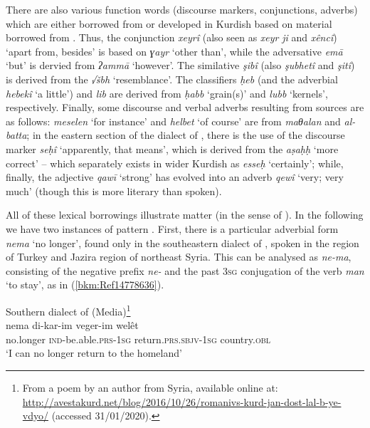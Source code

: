 \documentclass[output=paper]{langsci/langscibook}
\begin{document}
There are also various function words (discourse markers, conjunctions, adverbs) which are either borrowed from  or developed in Kurdish based on material borrowed from . Thus, the conjunction \textit{xeyrî} (also seen as \textit{xeyr} \textit{ji} and \textit{xêncî}) ‘apart from, besides’ is based on  \textit{ɣayr} ‘other than’, while the adversative \textit{emā} ‘but’ is dervied from  \textit{ʔammā} ‘however’. The similative \textit{şibî} (also \textit{şubhetî} and \textit{şitî}) is derived from the   \textit{√šbh} ‘resemblance’. The classifiers \textit{ḥeb} (and the adverbial \textit{hebekî} ‘a little’) and \textit{lib} are derived from  \textit{ḥabb} ‘grain(s)’ and \textit{lubb} ‘kernels’, respectively. Finally, some discourse and verbal adverbs resulting from  sources are as follows: \textit{meselen} ‘for instance’ and \textit{helbet} ‘of course’ are from  \textit{maθalan} and \textit{al-batta}; in the eastern section of the  dialect of , there is the use of the discourse marker \textit{seḥî} ‘apparently, that means’, which is derived from the  \textit{aṣaḥḥ} ‘more correct’ – which separately exists in wider Kurdish as \textit{esseḥ} ‘certainly’; while, finally, the  adjective \textit{qawī} ‘strong’ has evolved into an adverb \textit{qewî} ‘very; very much’ (though this is more literary than spoken).      

All of these lexical borrowings illustrate matter  (in the sense of \citealt{MatrasSakel2007}). In the following we have two instances of pattern . First, there is a particular adverbial form \textit{nema} ‘no longer’, found only in the southeastern dialect of , spoken in the  region of Turkey and Jazira region of northeast Syria. This can be analysed as \textit{ne-ma}, consisting of the negative prefix \textit{ne-} and the past  3\textsc{sg} conjugation of the verb \textit{man} ‘to stay’, as in (\ref{bkm:Ref14778636}).

\ea
Southern dialect of  (Media)\label{bkm:Ref14778636}\footnote{From a poem by an author from Syria, available online at: \url{http://avestakurd.net/blog/2016/10/26/romanivs-kurd-jan-dost-lal-b-ye-vdyo/} (accessed 31/01/2020).} \\
\gll nema di-kar-im veger-im welêt\\
     no.longer \textsc{ind}{}-be.able.\textsc{prs-1sg} return.\textsc{prs.sbjv-1sg} country.\textsc{obl}\\
\glt `I can no longer return to the homeland'\z
\end{document}
